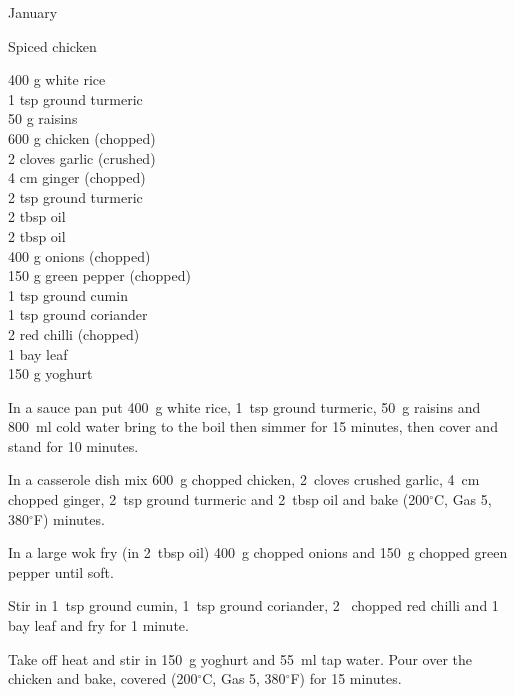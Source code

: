 \begin{menu}{January}
    \begin{recipe}{2}{Spiced chicken}%
		\begin{ingredients}
		400 g white rice  \\
	1 tsp ground turmeric  \\
	50 g raisins  \\
	600 g chicken (chopped) \\
	2 cloves garlic (crushed) \\
	4 cm ginger (chopped) \\
	2 tsp ground turmeric  \\
	2 tbsp oil  \\
	2 tbsp oil  \\
	400 g onions (chopped) \\
	150 g green pepper (chopped) \\
	1 tsp ground cumin  \\
	1 tsp ground coriander  \\
	2  red chilli (chopped) \\
	1  bay leaf  \\
	150 g yoghurt  \\
	
		\end{ingredients}
	
    \begin{instructions}
    \item 
      In a
      sauce pan
      put
      400~g  white rice,
      1~tsp  ground turmeric,
      50~g  raisins
      and
      800~ml  cold water
      bring to the boil then simmer for 15 minutes,
      then cover and stand for 10 minutes.
    \item 
        In a casserole dish mix
        600~g chopped chicken,
        2~cloves crushed garlic,
        4~cm chopped ginger,
        2~tsp  ground turmeric and
        2~tbsp  oil
        and
        bake (200$^{\circ}$C, Gas 5, 380$^{\circ}$F) minutes.
      \item 
        In a large wok fry
        (in 2~tbsp  oil)
        400~g chopped onions
        and
        150~g chopped green pepper
        until soft.
      \item 
        Stir in
        1~tsp  ground cumin,
        1~tsp  ground coriander,
        2~ chopped red chilli
        and
        1~  bay leaf
        and fry for 1 minute.
      \item 
        Take off heat
        and
        stir in
        150~g  yoghurt
        and
        55~ml  tap water.
        Pour over the chicken
        and bake,
        covered (200$^{\circ}$C, Gas 5, 380$^{\circ}$F) for 15 minutes.
      

\end{instructions}
\end{recipe}
\end{menu}
